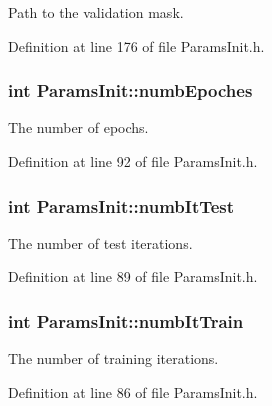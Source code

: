 Path to the validation mask. 



Definition at line 176 of file Params\+Init.\+h.

\subsubsection[{\texorpdfstring{numb\+Epoches}{numbEpoches}}]{\setlength{\rightskip}{0pt plus 5cm}int Params\+Init\+::numb\+Epoches}\hypertarget{classParamsInit_a8b2c46d51b5b121b74e318423ef12343}{}\label{classParamsInit_a8b2c46d51b5b121b74e318423ef12343}


The number of epochs. 



Definition at line 92 of file Params\+Init.\+h.

\subsubsection[{\texorpdfstring{numb\+It\+Test}{numbItTest}}]{\setlength{\rightskip}{0pt plus 5cm}int Params\+Init\+::numb\+It\+Test}\hypertarget{classParamsInit_af362ca101eef0ea95d5d63654f22f33b}{}\label{classParamsInit_af362ca101eef0ea95d5d63654f22f33b}


The number of test iterations. 



Definition at line 89 of file Params\+Init.\+h.

\subsubsection[{\texorpdfstring{numb\+It\+Train}{numbItTrain}}]{\setlength{\rightskip}{0pt plus 5cm}int Params\+Init\+::numb\+It\+Train}\hypertarget{classParamsInit_aeddf1c385f0a769fffb6025335e6eb0b}{}\label{classParamsInit_aeddf1c385f0a769fffb6025335e6eb0b}


The number of training iterations. 



Definition at line 86 of file Params\+Init.\+h.

